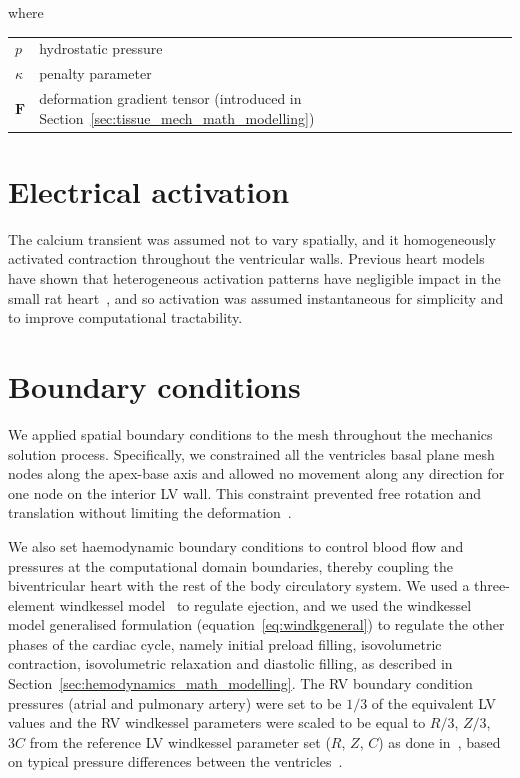 \noindent
where

\vspace{0.2cm}
\begin{tabular}{ll}
    $p$ & hydrostatic pressure \\
    $\kappa$ & penalty parameter \\
    $\mathbf{F}$ & deformation gradient tensor (introduced in Section~\ref{sec:tissue_mech_math_modelling})
\end{tabular}


%
%
%
\section{Electrical activation}\label{sec:ch2electricalactivation}
The calcium transient was assumed not to vary spatially, and it homogeneously activated contraction throughout the ventricular walls. Previous heart models have shown that heterogeneous activation patterns have negligible impact in the small rat heart~\cite{Land:2012}, and so activation was assumed instantaneous for simplicity and to improve computational tractability.


%
%
%
\section{Boundary conditions}\label{sec:ch2boundaryconditions}
We applied spatial boundary conditions to the mesh throughout the mechanics solution process. Specifically, we constrained all the ventricles basal plane mesh nodes along the apex-base axis and allowed no movement along any direction for one node on the interior LV wall. This constraint prevented free rotation and translation without limiting the deformation~\cite{Land:2012}.

\vspace{0.2cm}
We also set haemodynamic boundary conditions to control blood flow and pressures at the computational domain boundaries, thereby coupling the biventricular heart with the rest of the body circulatory system. We used a three-element windkessel model~\cite{Westerhof:1971} to regulate ejection, and we used the windkessel model generalised formulation (equation~\eqref{eq:windkgeneral}) to regulate the other phases of the cardiac cycle, namely initial preload filling, isovolumetric contraction, isovolumetric relaxation and diastolic filling, as described in Section~\ref{sec:hemodynamics_math_modelling}. The RV boundary condition pressures (atrial and pulmonary artery) were set to be $1/3$ of the equivalent LV values and the RV windkessel parameters were scaled to be equal to $R/3$, $Z/3$, $3C$ from the reference LV windkessel parameter set ($R$, $Z$, $C$) as done in~\cite{Land:2015*b}, based on typical pressure differences between the ventricles~\cite{Sia:2002}.


